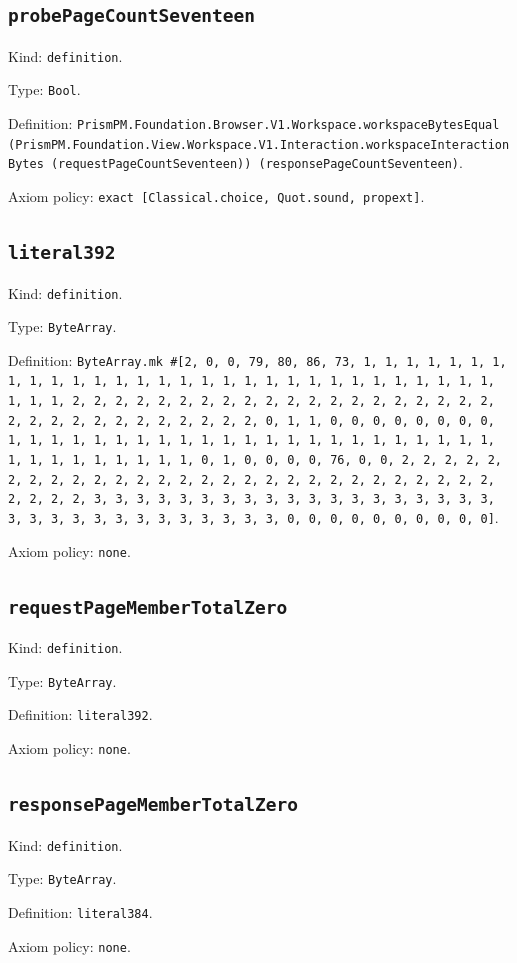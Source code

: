 \documentclass[11pt]{article}
\begin{document}
\subsection*{\texttt{probePageCountSeventeen}}
\noindent Kind: \texttt{definition}.\par
\noindent Type: \texttt{Bool}.\par
\noindent Definition: \texttt{PrismPM.Foundation.Browser.V1.Workspace.workspaceBytesEqual (PrismPM.Foundation.View.Workspace.V1.Interaction.workspaceInteractionBytes (requestPageCountSeventeen)) (responsePageCountSeventeen)}.\par
\noindent Axiom policy: \texttt{exact [Classical.choice, Quot.sound, propext]}.\par
\subsection*{\texttt{literal392}}
\noindent Kind: \texttt{definition}.\par
\noindent Type: \texttt{ByteArray}.\par
\noindent Definition: \texttt{ByteArray.mk \#[2, 0, 0, 79, 80, 86, 73, 1, 1, 1, 1, 1, 1, 1, 1, 1, 1, 1, 1, 1, 1, 1, 1, 1, 1, 1, 1, 1, 1, 1, 1, 1, 1, 1, 1, 1, 1, 1, 1, 1, 2, 2, 2, 2, 2, 2, 2, 2, 2, 2, 2, 2, 2, 2, 2, 2, 2, 2, 2, 2, 2, 2, 2, 2, 2, 2, 2, 2, 2, 2, 2, 2, 0, 1, 1, 0, 0, 0, 0, 0, 0, 0, 0, 1, 1, 1, 1, 1, 1, 1, 1, 1, 1, 1, 1, 1, 1, 1, 1, 1, 1, 1, 1, 1, 1, 1, 1, 1, 1, 1, 1, 1, 1, 1, 1, 0, 1, 0, 0, 0, 0, 76, 0, 0, 2, 2, 2, 2, 2, 2, 2, 2, 2, 2, 2, 2, 2, 2, 2, 2, 2, 2, 2, 2, 2, 2, 2, 2, 2, 2, 2, 2, 2, 2, 2, 2, 3, 3, 3, 3, 3, 3, 3, 3, 3, 3, 3, 3, 3, 3, 3, 3, 3, 3, 3, 3, 3, 3, 3, 3, 3, 3, 3, 3, 3, 3, 3, 3, 0, 0, 0, 0, 0, 0, 0, 0, 0, 0]}.\par
\noindent Axiom policy: \texttt{none}.\par
\subsection*{\texttt{requestPageMemberTotalZero}}
\noindent Kind: \texttt{definition}.\par
\noindent Type: \texttt{ByteArray}.\par
\noindent Definition: \texttt{literal392}.\par
\noindent Axiom policy: \texttt{none}.\par
\subsection*{\texttt{responsePageMemberTotalZero}}
\noindent Kind: \texttt{definition}.\par
\noindent Type: \texttt{ByteArray}.\par
\noindent Definition: \texttt{literal384}.\par
\noindent Axiom policy: \texttt{none}.\par
\end{document}
